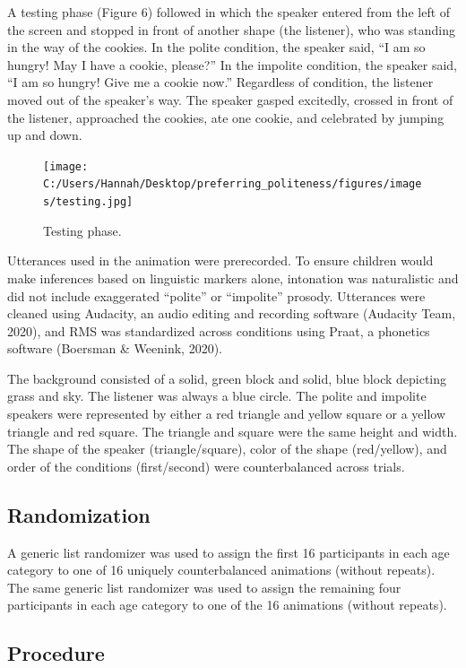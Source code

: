 \documentclass[
  english,
  man,floatsintext]{apa6}
\begin{document}
A testing phase (Figure 6) followed in which the speaker entered from the left of the screen and stopped in front of another shape (the listener), who was standing in the way of the cookies. In the polite condition, the speaker said, ``I am so hungry! May I have a cookie, please?'' In the impolite condition, the speaker said, ``I am so hungry! Give me a cookie now.'' Regardless of condition, the listener moved out of the speaker's way. The speaker gasped excitedly, crossed in front of the listener, approached the cookies, ate one cookie, and celebrated by jumping up and down.

\begin{figure}
\centering
\texttt{[image: C:/Users/Hannah/Desktop/preferring\_politeness/figures/images/testing.jpg]}
\caption{Testing phase.}
\end{figure}

Utterances used in the animation were prerecorded. To ensure children would make inferences based on linguistic markers alone, intonation was naturalistic and did not include exaggerated ``polite'' or ``impolite'' prosody. Utterances were cleaned using Audacity, an audio editing and recording software (Audacity Team, 2020), and RMS was standardized across conditions using Praat, a phonetics software (Boersman \& Weenink, 2020).

The background consisted of a solid, green block and solid, blue block depicting grass and sky. The listener was always a blue circle. The polite and impolite speakers were represented by either a red triangle and yellow square or a yellow triangle and red square. The triangle and square were the same height and width. The shape of the speaker (triangle/square), color of the shape (red/yellow), and order of the conditions (first/second) were counterbalanced across trials.

\hypertarget{randomization}{%
\subsection{Randomization}\label{randomization}}

A generic list randomizer was used to assign the first 16 participants in each age category to one of 16 uniquely counterbalanced animations (without repeats). The same generic list randomizer was used to assign the remaining four participants in each age category to one of the 16 animations (without repeats).

\hypertarget{procedure}{%
\subsection{Procedure}\label{procedure}}
\end{document}

